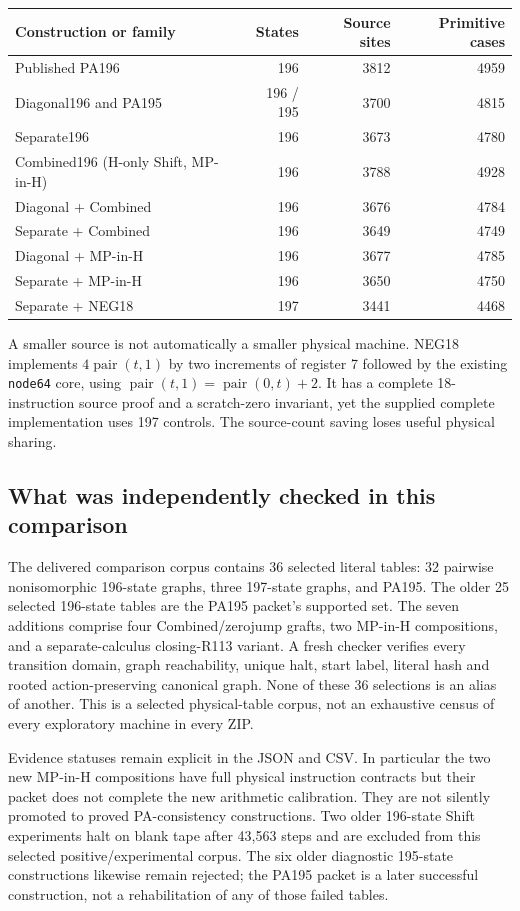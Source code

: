 \begin{center}
\small
\begin{tabular}{lrrr}
\toprule
Construction or family & States & Source sites & Primitive cases\\
\midrule
Published PA196 &196&3812&4959\\
Diagonal196 and PA195 &196 / 195&3700&4815\\
Separate196 &196&3673&4780\\
Combined196 (H-only Shift, MP-in-H)&196&3788&4928\\
Diagonal + Combined&196&3676&4784\\
Separate + Combined&196&3649&4749\\
Diagonal + MP-in-H&196&3677&4785\\
Separate + MP-in-H&196&3650&4750\\
Separate + NEG18&197&3441&4468\\
\bottomrule
\end{tabular}
\end{center}
A smaller source is not automatically a smaller physical machine. NEG18
implements \(4\operatorname{pair}(t,1)\) by two increments of register 7
followed by the existing \texttt{node64} core, using
\(\operatorname{pair}(t,1)=\operatorname{pair}(0,t)+2\).
It has a complete 18-instruction source proof and a scratch-zero invariant,
yet the supplied complete implementation uses 197 controls. The source-count
saving loses useful physical sharing.

\subsection{What was independently checked in this comparison}
The delivered comparison corpus contains 36 selected literal tables:
32 pairwise nonisomorphic 196-state graphs, three 197-state graphs, and PA195.
The older 25 selected 196-state tables are the PA195 packet's supported set.
The seven additions comprise four Combined/zerojump grafts, two MP-in-H
compositions, and a separate-calculus closing-R113 variant. A fresh checker
verifies every transition domain, graph reachability, unique halt, start label,
literal hash and rooted action-preserving canonical graph. None of these
36 selections is an alias of another. This is a selected physical-table corpus,
not an exhaustive census of every exploratory machine in every ZIP.

Evidence statuses remain explicit in the JSON and CSV. In particular the two
new MP-in-H compositions have full physical instruction contracts but their
packet does not complete the new arithmetic calibration. They are not silently
promoted to proved PA-consistency constructions. Two older 196-state Shift
experiments halt on blank tape after 43,563 steps and are excluded from this
selected positive/experimental corpus. The six older diagnostic 195-state
constructions likewise remain rejected; the PA195 packet is a later successful
construction, not a rehabilitation of any of those failed tables.

